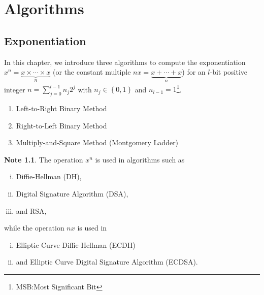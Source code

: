 \documentclass[12pt,openany]{book}
\theoremstyle{definition}
\newtheorem*{note}{Note}
\newcommand{\set}[1]{\left\{#1\right\}}
\begin{document}
	\newpage
	\chapter{Algorithms}
	\section{Exponentiation}
	In this chapter, we introduce three algorithms to compute the exponentiation $x^n=\underbrace{x\times\cdots\times x}_n$ (or the constant multiple $nx=\underbrace{x+\cdots+x}_n$) for an $l$-bit positive integer $n=\sum_{j=0}^{l-1}n_j2^j$ with $n_j\in\set{0,1}$ and $n_{l-1}=1$\footnote{MSB:Most Significant Bit}.
	\begin{center}
	\end{center}
	\begin{enumerate}[(1)]
		\item Left-to-Right Binary Method
		\item Right-to-Left Binary Method
		\item Multiply-and-Square Method (Montgomery Ladder)
	\end{enumerate}

	\begin{note}
		The operation $x^n$ is used in algorithms such as \begin{enumerate}[(i)]
			\item Diffie-Hellman (DH),
			\item Digital Signature Algorithm (DSA),
			\item and RSA,
		\end{enumerate} while the operation $nx$ is used in \begin{enumerate}[(i)]
		\item Elliptic Curve Diffie-Hellman (ECDH)
		\item and Elliptic Curve Digital Signature Algorithm (ECDSA).
	\end{enumerate}
	\end{note}
\end{document}
